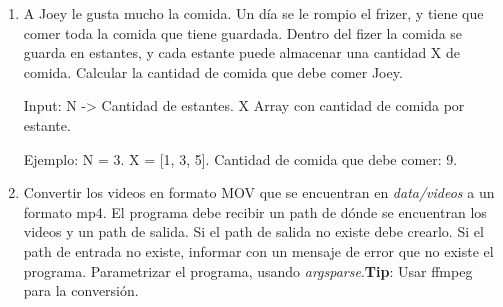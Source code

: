 \documentclass[12pt, spanish]{article}
\begin{document}
\begin{enumerate}
    \item A Joey le gusta mucho la comida. Un día se le rompio el frizer, y tiene que comer toda la comida que tiene guardada. Dentro del fizer la comida se guarda en estantes, y cada estante puede almacenar una cantidad X de comida. Calcular la cantidad de comida que debe comer Joey.
    
    Input: N -> Cantidad de estantes. X Array con cantidad de comida por estante.
    
    Ejemplo: N = 3. X = [1, 3, 5]. Cantidad de comida que debe comer: 9.
    
    \item Convertir los videos en formato MOV que se encuentran en \textit{data/videos} a un formato mp4. El programa debe recibir un path de dónde se encuentran los videos y un path de salida. Si el path de salida no existe debe crearlo. Si el path de entrada no existe, informar con un mensaje de error que no existe el programa. Parametrizar el programa, usando \textit{argsparse}.\textbf{Tip}: Usar ffmpeg para la conversión.
	
\end{enumerate}
\end{document}
